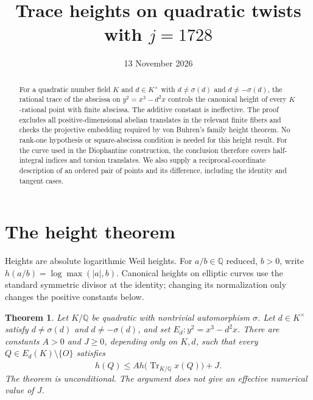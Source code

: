 \documentclass[11pt,a4paper]{article}
\title{Trace heights on quadratic twists with $j=1728$}
\author{}\date{13 November 2026}
\newtheorem{theorem}{Theorem}[section]\newtheorem{lemma}[theorem]{Lemma}\newtheorem{corollary}[theorem]{Corollary}\newtheorem{proposition}[theorem]{Proposition}
\newcommand{\Q}{\mathbb Q}\newcommand{\Z}{\mathbb Z}\DeclareMathOperator{\Tr}{Tr}
\begin{document}
\maketitle
\begin{abstract}
For a quadratic number field $K$ and $d\in K^\times$ with
$d\ne\sigma(d)$ and $d\ne-\sigma(d)$, the rational trace of the
abscissa on $y^2=x^3-d^2x$ controls the canonical height of every
$K$-rational point with finite abscissa. The additive constant is
ineffective. The proof excludes all positive-dimensional abelian
translates in the relevant finite fibers and checks the projective
embedding required by von Buhren's family height theorem. No rank-one
hypothesis or square-abscissa condition is needed for this height result.
For the curve used in the Diophantine construction, the conclusion
therefore covers half-integral indices and torsion translates. We also
supply a reciprocal-coordinate description of an ordered pair of points
and its difference, including the identity and tangent cases.
\end{abstract}

\section{The height theorem}
Heights are absolute logarithmic Weil heights. For $a/b\in\Q$ reduced,
$b>0$, write $h(a/b)=\log\max(|a|,b)$. Canonical heights on elliptic
curves use the standard symmetric divisor at the identity; changing
its normalization only changes the positive constants below.

\begin{theorem}\label{thm:height}
Let $K/\Q$ be quadratic with nontrivial automorphism $\sigma$. Let
$d\in K^\times$ satisfy $d\ne\sigma(d)$ and $d\ne-\sigma(d)$, and set
$E_d:y^2=x^3-d^2x$. There are constants $A>0$ and $J\ge0$, depending
only on $K,d$, such that every $Q\in E_d(K)\setminus\{O\}$ satisfies
\[
 \widehat h(Q)\le A h\bigl(\Tr_{K/\Q}x(Q)\bigr)+J.
\]
The theorem is unconditional. The argument does not give an effective
numerical value of $J$.
\end{theorem}
\end{document}
